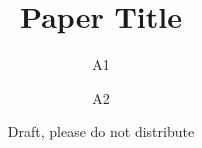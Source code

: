 \documentclass[10pt, twocolumn]{article}
\title{Paper Title}
\author{A1 \and A2}
\date{Draft, please do not distribute}
\begin{document}
\maketitle

\begin{abstract}
  
\end{abstract}










\end{document}
